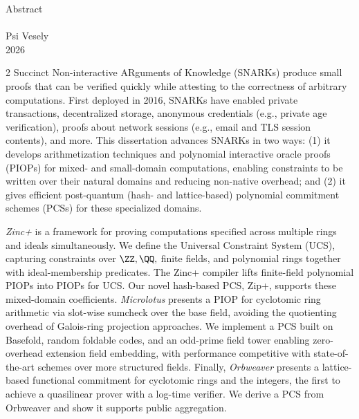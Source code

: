 \begin{center}
	Abstract\\
	\disstitle \\
	Psi Vesely \\
	2026
\end{center}

\begin{spacing}{2}
Succinct Non-interactive ARguments of Knowledge (SNARKs) produce small proofs that can be verified quickly while attesting to the correctness of arbitrary computations. First deployed in 2016, SNARKs have enabled private transactions, decentralized storage, anonymous credentials (e.g., private age verification), proofs about network sessions (e.g., email and TLS session contents), and more. This dissertation advances SNARKs in two ways: (1) it develops arithmetization techniques and polynomial interactive oracle proofs (PIOPs) for mixed- and small-domain computations, enabling constraints to be written over their natural domains and reducing non-native overhead; and (2) it gives efficient post-quantum (hash- and lattice-based) polynomial commitment schemes (PCSs) for these specialized domains.

\emph{Zinc+} is a framework for proving computations specified across multiple rings and ideals simultaneously. We define the Universal Constraint System (UCS), capturing constraints over $\ZZ,\QQ,$ finite fields, and polynomial rings together with ideal-membership predicates. The Zinc+ compiler lifts finite-field polynomial PIOPs into PIOPs for UCS. Our novel hash-based PCS, Zip+, supports these mixed-domain coefficients. \emph{Microlotus} presents a PIOP for cyclotomic ring arithmetic via slot-wise sumcheck over the base field, avoiding the quotienting overhead of Galois-ring projection approaches. We implement a PCS built on Basefold, random foldable codes, and an odd-prime field tower enabling zero-overhead extension field embedding, with performance competitive with state-of-the-art schemes over more structured fields. Finally, \emph{Orbweaver} presents a lattice-based functional commitment for cyclotomic rings and the integers, the first to achieve a quasilinear prover with a log-time verifier. We derive a PCS from Orbweaver and show it supports public aggregation.
\end{spacing}

